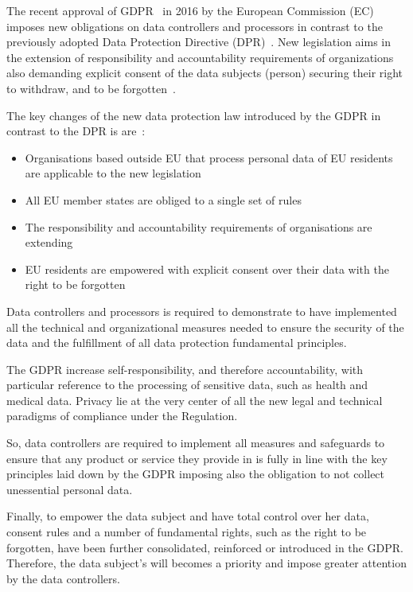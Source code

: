The recent approval of GDPR~\cite{gdpr} in 2016 by the European Commission (EC)
imposes new obligations on data controllers and processors in contrast to the previously adopted Data Protection Directive (DPR)~\cite{eu-46ec-1995}.
New legislation aims in the extension of responsibility and accountability requirements of organizations also demanding explicit
consent of the data subjects (person) securing their right to withdraw, and to be forgotten~\cite{DBLP:journals/corr/NeisseSF17}.

The key changes of the new data protection law introduced by the GDPR in contrast to the DPR is are~\cite{DBLP:journals/corr/NeisseSF17}:
\begin{itemize}
    \item Organisations based outside EU that process personal data of EU residents are applicable to the new legislation
    \item All EU member states are obliged to a single set of rules
    \item The responsibility and accountability requirements of organisations are extending
    \item EU residents are empowered with explicit consent over their data with the right to be forgotten
\end{itemize}

Data controllers and processors is required to demonstrate to have implemented all the technical and organizational measures needed to ensure the security of the data and the fulfillment of all data protection fundamental principles.

The GDPR increase self-responsibility, and therefore accountability, with particular reference to the processing of sensitive data, such as health and medical data. Privacy lie at the very center of all the new legal and technical paradigms of compliance under the Regulation.

So, data controllers are required to implement all measures and safeguards to ensure that any product or service they provide in is fully in line with the key principles laid down by the GDPR imposing also the obligation to not collect unessential personal data.

Finally, to empower the data subject and have total control over her data, consent rules and a number of fundamental rights, such as the right to be forgotten, have been further consolidated, reinforced or introduced in the GDPR. Therefore, the data subject's will becomes a priority and impose greater attention by the data controllers.


